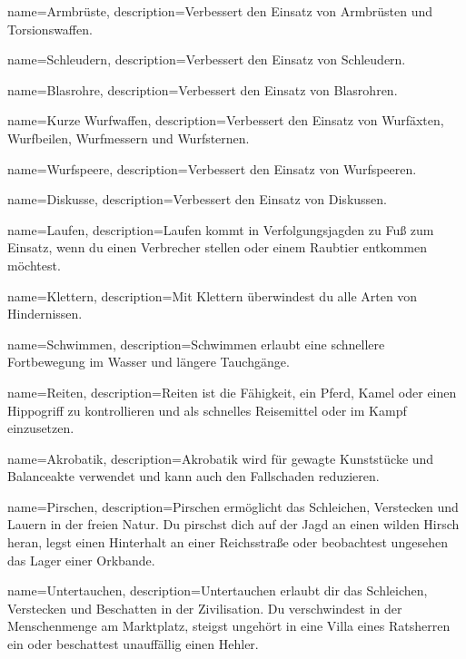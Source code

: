 {
    name={Armbrüste},
    description={Verbessert den Einsatz von Armbrüsten und Torsionswaffen.}
}


{
    name={Schleudern},
    description={Verbessert den Einsatz von Schleudern.}
}


{
    name={Blasrohre},
    description={Verbessert den Einsatz von Blasrohren.}
}


{
    name={Kurze Wurfwaffen},
    description={Verbessert den Einsatz von Wurfäxten, Wurfbeilen, Wurfmessern und Wurfsternen.}
}


{
    name={Wurfspeere},
    description={Verbessert den Einsatz von Wurfspeeren.}
}


{
    name={Diskusse},
    description={Verbessert den Einsatz von Diskussen.}
}


{
    name={Laufen},
    description={Laufen kommt in Verfolgungsjagden zu Fuß zum Einsatz, wenn du einen Verbrecher stellen oder einem Raubtier entkommen möchtest.}
}


{
    name={Klettern},
    description={Mit Klettern überwindest du alle Arten von Hindernissen.}
}


{
    name={Schwimmen},
    description={Schwimmen erlaubt eine schnellere Fortbewegung im Wasser und längere Tauchgänge.}
}


{
    name={Reiten},
    description={Reiten ist die Fähigkeit, ein Pferd, Kamel oder einen Hippogriff zu kontrollieren und als schnelles Reisemittel oder im Kampf einzusetzen.}
}


{
    name={Akrobatik},
    description={Akrobatik wird für gewagte Kunststücke und Balanceakte verwendet und kann auch den Fallschaden reduzieren.}
}


{
    name={Pirschen},
    description={Pirschen ermöglicht das Schleichen, Verstecken und Lauern in der freien Natur. Du pirschst dich auf der Jagd an einen wilden Hirsch heran, legst einen Hinterhalt an einer Reichsstraße oder beobachtest ungesehen das Lager einer Orkbande.}
}


{
    name={Untertauchen},
    description={Untertauchen erlaubt dir das Schleichen, Verstecken und Beschatten in der Zivilisation. Du verschwindest in der Menschenmenge am Marktplatz, steigst ungehört in eine Villa eines Ratsherren ein oder beschattest unauffällig einen Hehler.}
}


